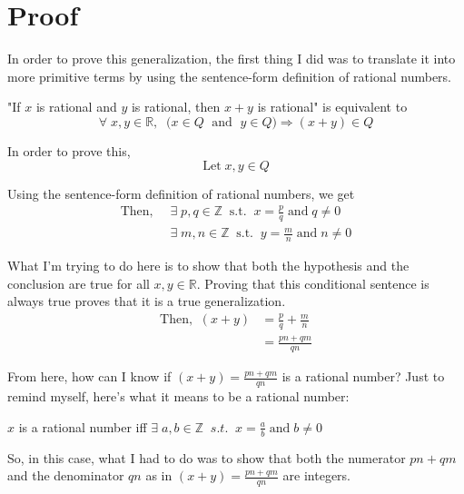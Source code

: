
\section*{Proof}

In order to prove this generalization,
the first thing I did was to translate it into more
primitive terms by using
the sentence-form definition of rational numbers.

"If $x$ is rational and $y$ is rational,
then $x+y$ is rational" is equivalent to
\begin{equation} \label{eq:1}
	\forall \;
	x,y \in \mathbb{R}, \; \;
	\big( x \in Q \; \text{ and } \; y \in Q \big)
	\Rightarrow
	(x+y) \in Q
\end{equation}

In order to prove this,
\begin{equation}
	\text{Let} \; x,y \in Q
\end{equation}

Using the sentence-form definition of rational
numbers, we get
\begin{align} 
	\text{Then,} \;\; &\exists \; p,q \in \mathbb{Z}
	\;\; \text{s.t.} \;\; x=\frac{p}{q}
	\; \text{and} \; q \neq 0 \label{eq:q}
	\\
	&\exists \; m,n \in \mathbb{Z}
	\;\; \text{s.t.} \;\; y=\frac{m}{n}
	\; \text{and} \; n \neq 0 \label{eq:n}
\end{align}

What I'm trying to do here is to show that
both the hypothesis and the conclusion are
true for all $x,y \in \mathbb{R}$.
Proving that this conditional
sentence is always true proves that it is
a true generalization.
\begin{align}
	\text{Then,} \;\; (x + y) &= \frac{p}{q} + \frac{m}{n}
	\\
	&= \frac{p n + q m}{q n} 
\end{align}

From here, how can I know if 
$(x + y) = \frac{p n + q m}{q n}$ is a rational number?
Just to remind myself, here's what it means to be
a rational number: 

$x$ is a rational number iff
$\exists \; a,b \in \mathbb{Z}
\;\; s.t. \;\; x = \frac{a}{b} 
\; \text{and} \; b \neq 0$

So, in this case, what I had to do was to
show that both the numerator $p n + q m$
and the denominator $q n$ as in
$(x + y) = \frac{p n + q m}{q n}$
are integers.


